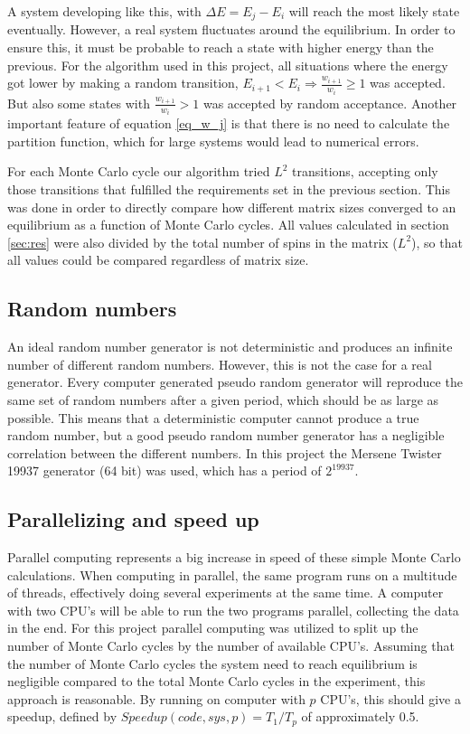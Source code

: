 A system developing like this, with $ \Delta E = E_j - E_i $ will reach the most likely state eventually. However, a real system fluctuates around the equilibrium. In order to ensure this, it must be probable to reach a state with higher energy than the previous. For the algorithm used in this project, all situations where the energy got lower by making a random transition, $E_{i+1}<E_{i} \Rightarrow \frac{w_{i+1}}{w_i}\geq 1 $ was accepted. But also some states with $ \frac{w_{i+1}}{w_i}>1 $ was accepted by random acceptance. Another important feature of equation  \ref{eq_w_j} is that there is no need to calculate the partition function, which for large systems would lead to numerical errors. 


For each Monte Carlo cycle our algorithm tried  $ L^2 $ transitions, accepting only those transitions that fulfilled the requirements set in the previous section. This was done in order to directly compare how different matrix sizes converged to an equilibrium as a function of Monte Carlo cycles. All values calculated in section \ref{sec:res} were also divided by the total number of spins in the matrix ($ L^2 $), so that all values could be compared regardless of matrix size. 


\subsection{Random numbers}
An ideal random number generator is not deterministic and produces an infinite number of different random numbers. However, this is not the case for a real generator. Every computer generated pseudo random generator will reproduce the same set of random numbers after a given period, which should be as large as possible. This means that a deterministic computer cannot produce a true random number, but a good pseudo random number generator has  a negligible  correlation between the different numbers. In this project the Mersene Twister 19937 generator (64 bit)
was used, which has a period of $ 2^{19937} $.


\subsection{Parallelizing and speed up }
	Parallel computing represents a big increase in speed of these simple Monte Carlo calculations. When computing in parallel, the same program runs on a multitude of threads, effectively doing several experiments at the same time. A computer with two CPU's will be able to run the two programs parallel, collecting the data in the end. For this project parallel computing was utilized to split up the number of Monte Carlo cycles by the number of available CPU's. Assuming that the number of Monte Carlo cycles the system need to reach equilibrium is negligible compared to the total Monte Carlo cycles in the experiment, this approach is reasonable. By running on computer with $ p $ CPU's, this should give a speedup, defined by $Speedup(code,sys,p) = T_1/T_p$ of approximately 0.5.  
	

